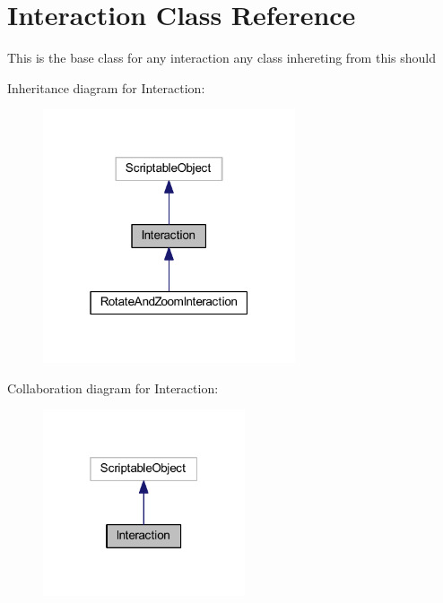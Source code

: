 \hypertarget{class_interaction}{}\section{Interaction Class Reference}
\label{class_interaction}


This is the base class for any interaction any class inhereting from this should  




Inheritance diagram for Interaction\+:
\nopagebreak
\begin{figure}[H]
\begin{center}
\leavevmode
\includegraphics[width=211pt]{class_interaction__inherit__graph}
\end{center}
\end{figure}


Collaboration diagram for Interaction\+:
\nopagebreak
\begin{figure}[H]
\begin{center}
\leavevmode
\includegraphics[width=169pt]{class_interaction__coll__graph}
\end{center}
\end{figure}
